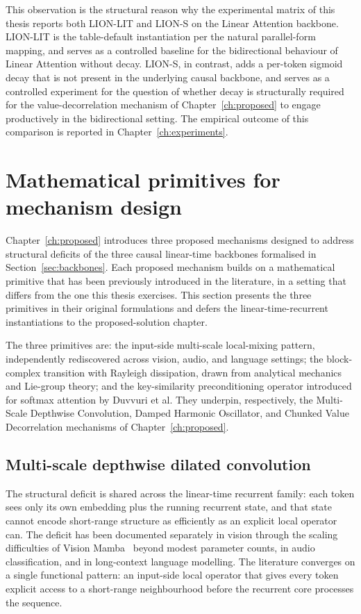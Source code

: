This observation is the structural reason why the experimental matrix
of this thesis reports both LION-LIT and LION-S on the Linear
Attention backbone. LION-LIT is the table-default instantiation per
the natural parallel-form mapping, and serves as a controlled
baseline for the bidirectional behaviour of Linear Attention without
decay. LION-S, in contrast, adds a per-token sigmoid decay that is
not present in the underlying causal backbone, and serves as a
controlled experiment for the question of whether decay is
structurally required for the value-decorrelation mechanism of
Chapter~\ref{ch:proposed} to engage productively in the bidirectional
setting. The empirical outcome of this comparison is reported in
Chapter~\ref{ch:experiments}.

\section{Mathematical primitives for mechanism design}\label{sec:primitives}

Chapter~\ref{ch:proposed} introduces three proposed mechanisms designed
to address structural deficits of the three causal linear-time backbones
formalised in Section~\ref{sec:backbones}. Each proposed mechanism
builds on a mathematical primitive that has been previously introduced
in the literature, in a setting that differs from the one this thesis
exercises. This section presents the three primitives in their original
formulations and defers the linear-time-recurrent instantiations to the
proposed-solution chapter.

The three primitives are: the input-side multi-scale local-mixing
pattern, independently rediscovered across vision, audio, and language
settings; the block-complex transition with Rayleigh dissipation,
drawn from analytical mechanics and Lie-group theory; and the
key-similarity preconditioning operator introduced for softmax
attention by Duvvuri et al. They underpin, respectively, the
Multi-Scale Depthwise Convolution, Damped Harmonic Oscillator, and
Chunked Value Decorrelation mechanisms of Chapter~\ref{ch:proposed}.

\subsection{Multi-scale depthwise dilated convolution}\label{sec:primitives:msdc}

The structural deficit is shared across the linear-time recurrent
family: each token sees only its own embedding plus the running
recurrent state, and that state cannot encode short-range structure as
efficiently as an explicit local operator can. The deficit has been
documented separately in vision through the scaling difficulties of
Vision Mamba~\cite{zhu2024visionmamba} beyond modest parameter counts,
in audio classification, and in long-context language modelling. The
literature converges on a single functional pattern: an input-side
local operator that gives every token explicit access to a short-range
neighbourhood before the recurrent core processes the sequence.

